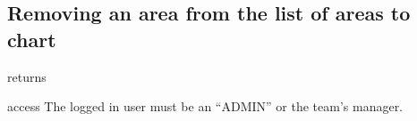 \subsection{Removing an area from the list of areas to chart}

\begin{apidata}{returns}
  \begin{datalist}
  \end{datalist}
\end{apidata}
\begin{apidata}{access}
The logged in user must be an ``ADMIN'' or the team's manager.
\end{apidata}



